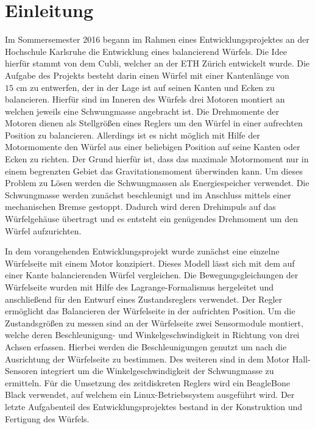 \chapter{Einleitung}
Im Sommersemester 2016 begann im Rahmen eines Entwicklungsprojektes an der Hochschule Karlsruhe die Entwicklung eines balancierend Würfels. Die Idee hierfür stammt von dem Cubli\cite{Cubli1}, welcher an der ETH Zürich entwickelt wurde. Die Aufgabe des Projekts besteht darin einen Würfel mit einer Kantenlänge von $15\text{ cm}$ zu entwerfen, der in der Lage ist auf seinen Kanten und Ecken zu balancieren. Hierfür sind im Inneren des Würfels drei Motoren montiert an welchen jeweils eine Schwungmasse angebracht ist. Die Drehmomente der Motoren dienen als Stellgrößen eines Reglers um den Würfel in einer aufrechten Position zu balancieren. Allerdings ist es nicht möglich mit Hilfe der Motormomente den Würfel aus einer beliebigen Position auf seine Kanten oder Ecken zu richten. Der Grund hierfür ist, dass das maximale Motormoment nur in einem begrenzten Gebiet das Gravitationsmoment überwinden kann. Um dieses Problem zu Lösen werden die Schwungmassen als Energiespeicher verwendet. Die Schwungmasse werden zunächst beschleunigt und im Anschluss mittels einer mechanischen Bremse gestoppt. Dadurch wird deren Drehimpuls auf das Würfelgehäuse übertragt und es entsteht ein genügendes Drehmoment um den Würfel aufzurichten.

In dem vorangehenden Entwicklungsprojekt wurde zunächst eine einzelne Würfelseite mit einem Motor konzipiert. Dieses Modell lässt sich mit dem auf einer Kante balancierenden Würfel vergleichen. Die Bewegungsgleichungen der Würfelseite wurden mit Hilfe des Lagrange-Formalismus hergeleitet und anschließend für den Entwurf eines Zustandsreglers verwendet. Der Regler ermöglicht das Balancieren der Würfelseite in der aufrichten Position. Um die Zustandsgrößen zu messen sind an der Würfelseite zwei Sensormodule montiert, welche deren Beschleunigung- und Winkelgeschwindigkeit in Richtung von drei Achsen erfassen. Hierbei werden die Beschleunigungen genutzt um nach \cite{Cubli1} die Ausrichtung der Würfelseite zu bestimmen. Des weiteren sind in dem Motor Hall-Sensoren integriert um die Winkelgeschwindigkeit der Schwungmasse zu ermitteln. Für die Umsetzung des zeitdiskreten Reglers wird ein BeagleBone Black verwendet, auf welchem ein Linux-Betriebssystem ausgeführt wird. Der letzte Aufgabenteil des Entwicklungsprojektes bestand in der Konstruktion und Fertigung des Würfels.

